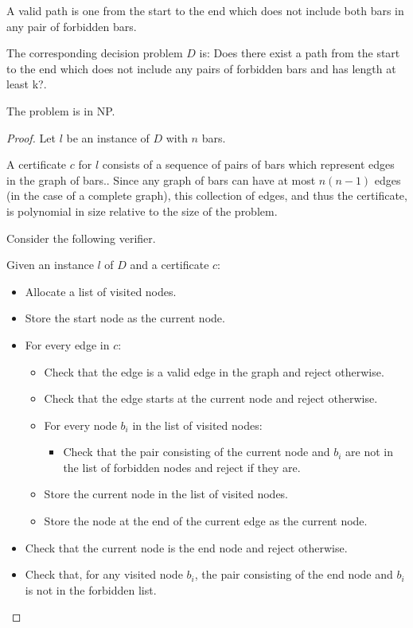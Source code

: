 \documentclass[11pt]{article}
\begin{document}
A valid path is one from the start to the end which does not include both bars in any pair of forbidden bars.

The corresponding decision problem $D$ is: Does there exist a path from the start to the end which does not include any pairs of forbidden bars and has length at least k?.

The problem is in NP.
\begin{proof}
    Let $l$ be an instance of $D$ with $n$ bars.

    A certificate $c$ for $l$ consists of a sequence of pairs of bars which represent edges in the graph of bars.. Since any graph of bars can have at most $n(n-1)$ edges (in the case of a complete graph), this collection of edges, and thus the certificate, is polynomial in size relative to the size of the problem.

    Consider the following verifier.

    Given an instance $l$ of $D$ and a certificate $c$:
    \begin{itemize}
        \item Allocate a list of visited nodes.
        \item Store the start node as the current node.
        \item For every edge in $c$:
        \begin{itemize}
            \item Check that the edge is a valid edge in the graph and reject otherwise.
            \item Check that the edge starts at the current node and reject otherwise.
            \item For every node $b_i$ in the list of visited nodes:
                \begin{itemize}
                    \item Check that the pair consisting of the current node and $b_i$ are not in the list of forbidden nodes and reject if they are.
                \end{itemize}
            \item Store the current node in the list of visited nodes.
            \item Store the node at the end of the current edge as the current node.
        \end{itemize}
        \item Check that the current node is the end node and reject otherwise.
        \item Check that, for any visited node $b_i$, the pair consisting of the end node and $b_i$ is not in the forbidden list.
    \end{itemize}


\end{proof}
\end{document}
